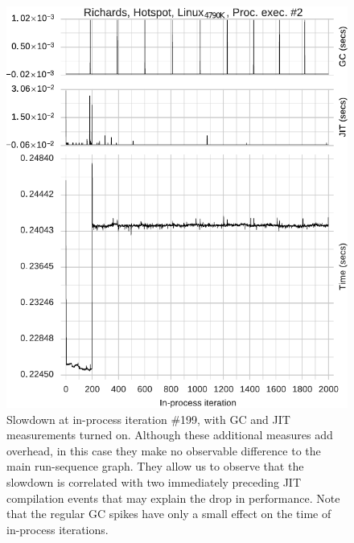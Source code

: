 \documentclass[acmlarge]{acmart}\settopmatter{printfolios=true}
\begin{document}
\begin{figure}[!tbp]
\centering
\begin{minipage}[b]{0.49\textwidth}
\includegraphics[width=\textwidth]{examples/new_miscomp.pdf}
\caption{Slowdown at in-process iteration \#199, with GC and JIT measurements
turned on. Although these additional measures add overhead, in this
case they make no observable difference to the main run-sequence graph. They
allow us to observe that the slowdown is correlated with two immediately preceding JIT compilation events
that may explain the drop in performance. Note that the
regular GC spikes have only a small effect on the time of in-process
iterations. }
\label{fig:examples:slowdown1}
\end{minipage}
\hfill
\begin{minipage}[b]{0.49\textwidth}

\end{minipage}
\end{figure}
\end{document}
